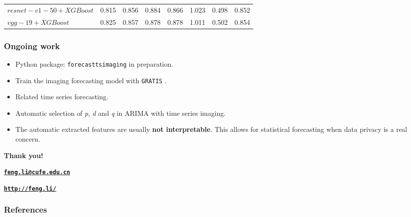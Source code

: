 \documentclass[10pt,aspectratio=43]{beamer}
\begin{document}
\begin{frame}
\begin{table}
{\begin{tabular}{llllllll}
      $resnet-v1-50+XGBoost$ &0.815  &0.856 &0.884  &0.866  &1.023 &0.498 &0.852     \\
      $vgg-19+XGBoost$ &0.825  &0.857 &0.878  &0.878  &1.011 &0.502 &0.854     \\
      \bottomrule
    \end{tabular}
  }
\end{table}

\end{frame}


\begin{frame}
  \frametitle{Ongoing work}

  \begin{itemize}
  \item Python package: {\color{blue} \texttt{forecasttsimaging}} in preparation.
  \item Train the imaging forecasting model with {\color{blue} \texttt{GRATIS}} \citep*{kang2019gratis}.

  \item Related time series forecasting.
  \item Automatic selection of \emph{p}, \emph{d} and \emph{q} in ARIMA with time series imaging.

  \item The automatic extracted features are usually\textbf{ not interpretable}.  This
    allows for statistical forecasting when data privacy is a real concern.

  \end{itemize}

\end{frame}
\begin{frame}[plain]
  \addtocounter{framenumber}{-1}
  \begin{center}
    {\color{SUblue} \textbf{\Huge Thank you!}}
    \vspace{1cm}

    {\texttt{\textbf{\url{feng.li@cufe.edu.cn}}}}

    \vspace{1cm}

    {\texttt{\textbf{\url{http://feng.li/}}}}

  \end{center}
\end{frame}

\begin{frame}%
  \frametitle{References}
  \tiny


\end{frame}
\end{document}
